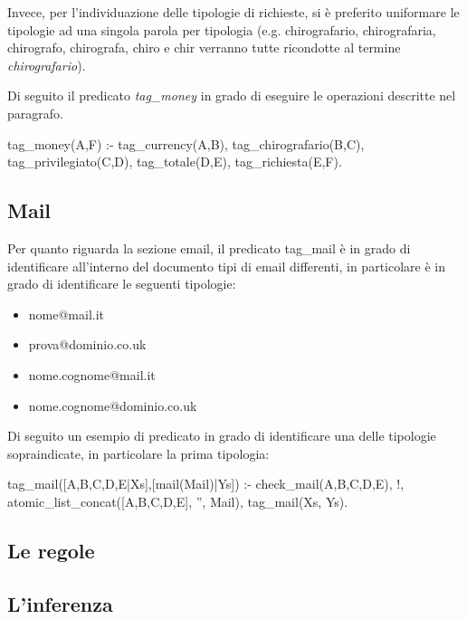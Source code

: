 Invece, per l'individuazione delle tipologie di richieste, si è preferito uniformare le tipologie ad una singola parola per tipologia (e.g. chirografario, chirografaria, chirografo, chirografa, chiro e chir verranno tutte ricondotte al termine \emph{chirografario}).

Di seguito il predicato \emph{tag\_money} in grado di eseguire le operazioni descritte nel paragrafo.

\begin{prologcode}
tag_money(A,F) :- 
    tag_currency(A,B),
    tag_chirografario(B,C),
    tag_privilegiato(C,D),
    tag_totale(D,E),
    tag_richiesta(E,F).
\end{prologcode}

\subsection{Mail}
Per quanto riguarda la sezione email, il predicato tag\_mail è in grado di identificare all'interno del documento tipi di email differenti, in particolare è in grado di identificare le seguenti tipologie:
\begin{itemize}
\item nome@mail.it
\item prova@dominio.co.uk
\item nome.cognome@mail.it
\item nome.cognome@dominio.co.uk
\end{itemize}

Di seguito un esempio di predicato in grado di identificare una delle tipologie sopraindicate, in particolare la prima tipologia:

\begin{prologcode}
tag_mail([A,B,C,D,E|Xs],[mail(Mail)|Ys]) :-
    check_mail(A,B,C,D,E),
    !,
    atomic_list_concat([A,B,C,D,E], '', Mail),
    tag_mail(Xs, Ys).
\end{prologcode}




\subsection{Le regole}
\subsection{L'inferenza}
